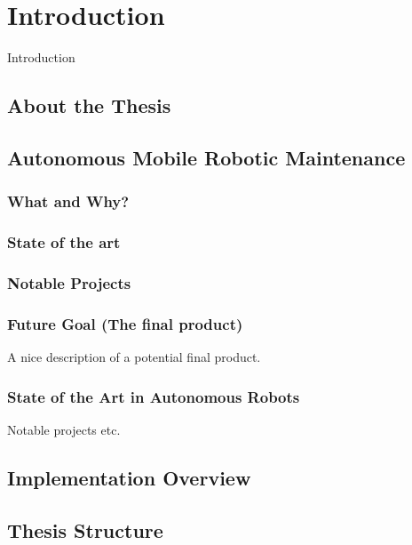 \chapter{Introduction}
\label{chp:introduction} 

Introduction
\section{About the Thesis}

\section{Autonomous Mobile Robotic Maintenance}

\subsection{What and Why?}

\subsection{State of the art}

\subsection{Notable Projects}

\subsection{Future Goal (The final product)}
A nice description of a potential final product.

\subsection{State of the Art in Autonomous Robots}
Notable projects etc.

\section{Implementation Overview}

\section{Thesis Structure}